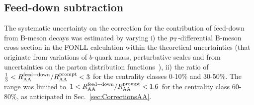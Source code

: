\subsection{Feed-down subtraction}
\label{sec:FDsystAA}
The systematic uncertainty on the correction for the contribution of feed-down from 
B-meson decays was estimated by varying i)
the $p_{\rm T}$-differential B-meson cross section in the 
FONLL calculation within the theoretical uncertainties (that originate from variations of 
$b$-quark mass, perturbative scales and from uncertainties on the parton distribution functions~\cite{Cacciari:2012ny}), 
ii) the ratio of $\frac{1}{3} < R_{\rm AA}^{\rm  feed-down}/R_{\rm AA}^{\rm prompt} < 3$ 
for the centrality classes 0-10\% and 30-50\%. The range was limited to 
$1 < R_{\rm AA}^{\rm  feed-down} / R_{\rm AA}^{\rm prompt} < 1.6$ 
for the centrality class 60-80\%, as anticipated in Sec.~\ref{sec:CorrectionsAA}.

